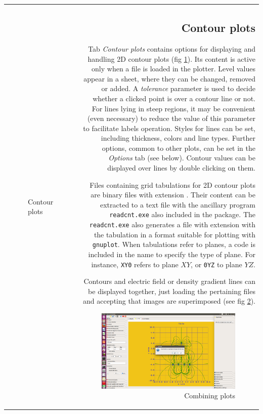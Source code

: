 \documentclass[10pt]{article}
\begin{document}
\begin{tabular}{lr}
\begin{minipage}{.5\linewidth}
\begin{figure}[H]
\begin{center}
\end{center}
\caption{Contour plots \label{fig:3_3c}}
\end{figure}
\end{minipage}
&
\begin{minipage}{.5\linewidth}

\subsection{Contour plots \label{sec:3.1}\index{2D graphics!contour plots}}

Tab {\it Contour plots} contains options for displaying and handling 2D contour plots (fig \ref{fig:3_3c}). Its content is active only when a \cnt{ }
file is loaded in the plotter. 
Level values appear in a sheet, where they can be changed, removed or added.
A {\it tolerance} parameter is used to decide whether a
clicked point is over a contour line or not. For lines lying in steep regions,
it may be convenient (even necessary) to reduce the value of this parameter to
facilitate labels operation. Styles for lines can be set, including thickness, colors and 
line types. Further options, common to other plots, can be set in the {\it Options} tab (see below).
Contour values can be displayed over lines by double clicking on them.

Files containing grid tabulations for 2D contour plots are binary files with
extension \cnt{}. Their content can be extracted to a text file with the
ancillary program \texttt{readcnt.exe} also included in the package. The
\texttt{readcnt.exe} also generates a file with extension \gnu{ } with the
tabulation in a format suitable for plotting with \texttt{gnuplot}.
When tabulations refer to planes, a code is included in the name to specify the type of plane.
For instance, \texttt{XY0} refers to plane $XY$, or \texttt{0YZ} to plane $YZ$. 

Contours and electric field or density gradient lines can be displayed together, 
just loading the pertaining files and accepting that images are superimposed 
(see fig \ref{fig:3_3b}).

\vspace*{1mm}
\begin{figure}[H]
    \begin{center}
        \includegraphics[width=.8\linewidth]{damqt_fig_3_4.png}
    \end{center}
    \caption{Combining plots \label{fig:3_3b}}
\end{figure}


\end{minipage}
\end{tabular}
\end{document}

